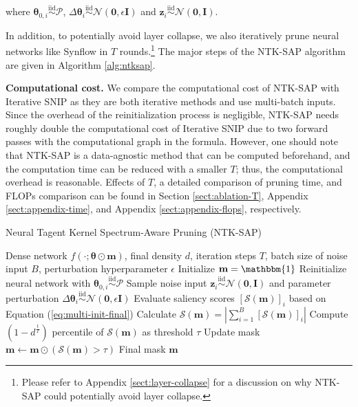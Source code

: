 \documentclass{article} %
\begin{document}
where $\boldsymbol{\theta}_{0,i} \overset{\mathrm{iid}}{\sim} \mathcal{P}$, $\Delta \boldsymbol{\theta}_{i} \overset{\mathrm{iid}}{\sim} \mathcal{N}(\textbf{0},\epsilon\textbf{I})$ and $\mathbf{z}_{i} \overset{\mathrm{iid}}{\sim} \mathcal{N}(\textbf{0},\textbf{I})$.
 
In addition, to potentially avoid layer collapse, we also iteratively prune neural networks like Synflow  in $T$ rounds.\footnote{Please refer to Appendix \ref{sect:layer-collapse} for a discussion on why NTK-SAP could potentially avoid layer collapse.}
The major steps of the NTK-SAP algorithm are given in Algorithm \ref{alg:ntksap}.

\textbf{Computational cost.} We compare the computational cost of NTK-SAP with Iterative SNIP as they are both iterative methods and use multi-batch inputs. Since the overhead of the reinitialization process is negligible, NTK-SAP needs roughly double the computational cost of Iterative SNIP due to two forward passes with the computational graph in the formula. However, one should note that NTK-SAP is a data-agnostic method that can be computed beforehand, and the computation time can be reduced with a smaller $T$; thus, the computational overhead is reasonable. Effects of $T$, a detailed comparison of pruning time, and FLOPs comparison can be found in Section \ref{sect:ablation-T}, Appendix \ref{sect:appendix-time}, and Appendix \ref{sect:appendix-flops}, respectively.

\begin{algorithm}[t!]
\caption{Neural Tagent Kernel Spectrum-Aware Pruning (NTK-SAP)}
\label{alg:ntksap}
\begin{algorithmic}[1]
{\small
\REQUIRE Dense network $f(\cdot; \boldsymbol{\theta} \odot \mathbf{m})$, final density $d$, iteration steps $T$, batch size of noise input $B$, perturbation hyperparameter $\epsilon$
\STATE Initialize $\mathbf{m}=\mathbbm{1}$
    \STATE Reinitialize neural network with $\boldsymbol{\theta}_{0,i} \overset{\mathrm{iid}}{\sim} \mathcal{P}$
    \STATE Sample noise input $\mathbf{z}_{i} \overset{\mathrm{iid}}{\sim} \mathcal{N}(\textbf{0},\textbf{I})$ and parameter perturbation $\Delta \boldsymbol{\theta}_{i} \overset{\mathrm{iid}}{\sim} \mathcal{N}(\textbf{0},\epsilon\textbf{I})$
    \STATE Evaluate saliency scores $\left[\mathcal{S}(\mathbf{m})\right]_i$ based on Equation (\ref{eq:multi-init-final})
 \ENDFOR
 \STATE Calculate $\mathcal{S}(\mathbf{m})=\left|\sum_{i=1}^B\left[\mathcal{S}(\mathbf{m})\right]_i\right|$ 
 \STATE Compute $(1-d^{\frac{t}{T}})$ percentile of $\mathcal{S}(\mathbf{m})$ as threshold $\tau$
 \STATE Update mask $\mathbf{m} \leftarrow \mathbf{m} \odot (\mathcal{S}(\mathbf{m})>\tau) $
\ENDFOR
\RETURN Final mask $\mathbf{m}$
}
\end{algorithmic}
\end{algorithm}
\end{document}
